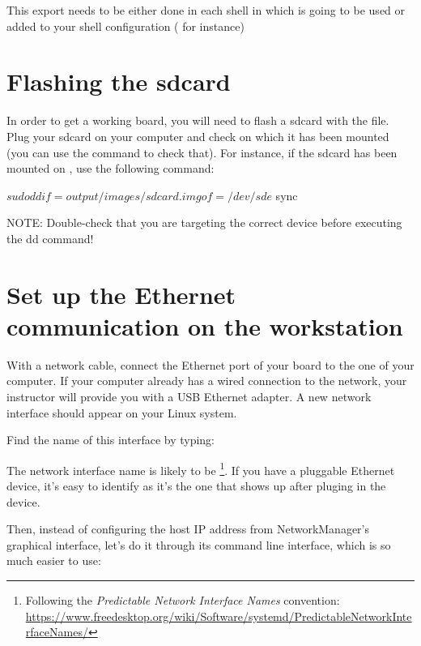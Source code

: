 This export needs to be either done in each shell in which  is
going to be used or added to your shell configuration ( for
instance)

\section{Flashing the sdcard}

In order to get a working board, you will need to flash a sdcard with the 
 file. Plug your sdcard on your computer and
check on which  it has been mounted (you can use the 
command to check that). For instance, if the sdcard has been mounted on
, use the following command:

\begin{bashinput}
$ sudo dd if=output/images/sdcard.img of=/dev/sde
$ sync
\end{bashinput}

NOTE: Double-check that you are targeting the correct device before executing
the dd command!


\section{Set up the Ethernet communication on the workstation}

With a network cable, connect the Ethernet port of your board to the
one of your computer. If your computer already has a wired connection
to the network, your instructor will provide you with a USB Ethernet
adapter. A new network interface should appear on your Linux system.

Find the name of this interface by typing:

The network interface name is likely to be
\footnote{Following the {\em Predictable Network Interface
Names} convention:
\url{https://www.freedesktop.org/wiki/Software/systemd/PredictableNetworkInterfaceNames/}}.
If you have a pluggable Ethernet device, it's easy to identify as it's
the one that shows up after pluging in the device.

Then, instead of configuring the host IP address from NetworkManager’s graphical interface,
let’s do it through its command line interface, which is so much easier to use:

